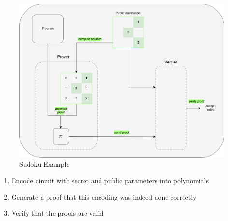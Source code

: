 \begin{figure}[H]
    \centering
    \includegraphics[width=0.75\linewidth]{figures/sudoku.drawio.png}
    \caption{Sudoku Example}
\end{figure}

\begin{enumerate}
    \item Encode circuit with secret and public parameters into polynomials
    \item Generate a proof that this encoding was indeed done correctly
    \item Verify that the proofs are valid
\end{enumerate}





